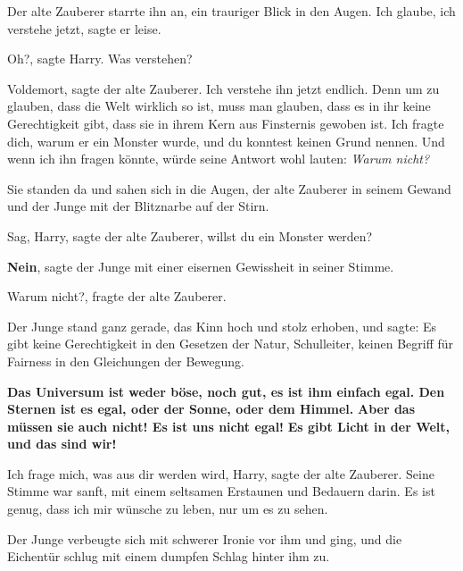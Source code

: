 Der alte Zauberer starrte ihn an, ein trauriger Blick in den Augen. \glqq{}Ich
glaube, ich verstehe jetzt\grqq{}, sagte er leise.

\glqq{}Oh?\grqq{}, sagte Harry. \glqq{}Was verstehen?\grqq{}

\glqq{}Voldemort\grqq{}, sagte der alte Zauberer. \glqq{}Ich verstehe ihn jetzt
endlich. Denn um zu glauben, dass die Welt wirklich so ist, muss man glauben,
dass es in ihr keine Gerechtigkeit gibt, dass sie in ihrem Kern aus Finsternis
gewoben ist. Ich fragte dich, warum er ein Monster wurde, und du konntest keinen
Grund nennen. Und wenn ich ihn fragen könnte, würde seine Antwort wohl lauten:
\emph{Warum nicht?}\grqq{}

Sie standen da und sahen sich in die Augen, der alte Zauberer in seinem Gewand
und der Junge mit der Blitznarbe auf der Stirn.

\glqq{}Sag, Harry\grqq{}, sagte der alte Zauberer, \glqq{}willst du ein Monster
werden?\grqq{}

\glqq{}\textbf{Nein}\grqq{}, sagte der Junge mit einer eisernen Gewissheit in
seiner Stimme.

\glqq{}Warum nicht?\grqq{}, fragte der alte Zauberer.

Der Junge stand ganz gerade, das Kinn hoch und stolz erhoben, und sagte: \glqq{}
Es gibt keine Gerechtigkeit in den Gesetzen der Natur, Schulleiter, keinen
Begriff für Fairness in den Gleichungen der Bewegung.

\textbf{Das Universum ist weder böse, noch gut, es ist ihm einfach egal. Den
Sternen ist es egal, oder der Sonne, oder dem Himmel.} \textbf{Aber das müssen
sie auch nicht! Es ist uns nicht egal!} \textbf{Es gibt Licht in der Welt, und
das sind wir!}\grqq{}

\glqq{}Ich frage mich, was aus dir werden wird, Harry\grqq{}, sagte der alte
Zauberer. Seine Stimme war sanft, mit einem seltsamen Erstaunen und Bedauern
darin. \glqq{}Es ist genug, dass ich mir wünsche zu leben, nur um es zu
sehen.\grqq{}

Der Junge verbeugte sich mit schwerer Ironie vor ihm und ging, und die Eichentür
schlug mit einem dumpfen Schlag hinter ihm zu.

